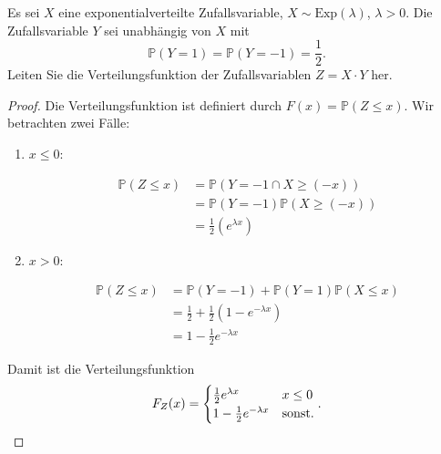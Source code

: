 \begin{Problem}
	Es sei \(X\) eine exponentialverteilte Zufallsvariable, \(X \sim \text{Exp}(\lambda)\), \(\lambda > 0\). Die Zufallsvariable \(Y\) sei unabhängig von \(X\) mit 
	\[
	\mathbb{P}(Y = 1) = \mathbb{P}(Y = -1) = \frac{1}{2}.
	\]
	Leiten Sie die Verteilungsfunktion der Zufallsvariablen \(Z = X \cdot Y\) her.
\end{Problem}
\begin{proof}
	Die Verteilungsfunktion ist definiert durch $F(x)=\mathbb{P}(Z \le x)$. Wir betrachten zwei F\"{a}lle:
	\begin{enumerate}
		\item $x\le 0$:

	\begin{align*}
		\mathbb{P}(Z\le x) &=\mathbb{P}(Y = -1 \cap X \ge (-x))\\
				   &=\mathbb{P}(Y = -1)\mathbb{P}(X \ge (-x))\\
				   &=\frac{1}{2}(e^{\lambda x})
	\end{align*}
\item $x > 0$:

	\begin{align*}
		\mathbb{P}(Z \le x) &= \mathbb{P}(Y = -1) + \mathbb{P}(Y = 1)\mathbb{P}(X \le x)\\
				    &= \frac{1}{2}+ \frac{1}{2}(1 - e^{-\lambda x})\\
				    &= 1-\frac{1}{2}e^{-\lambda x}
	\end{align*}
	\end{enumerate}
	Damit ist die Verteilungsfunktion
	\[
	F_Z(x) = \begin{cases}
		\frac{1}{2}e^{\lambda x} & x \le 0\\
		1 - \frac{1}{2}e^{-\lambda x} & \text{sonst.}
	\end{cases}
	.\qedhere\] 
\end{proof}
